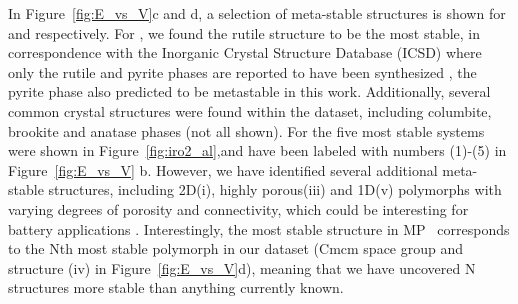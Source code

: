 In Figure~\ref{fig:E_vs_V}c and d, a selection of meta-stable structures is shown for \IrOtwo and \IrOthree respectively.
For \IrOtwo, we found the rutile structure to be the most stable, in correspondence with the Inorganic Crystal Structure Database (ICSD) where only the rutile and pyrite phases are reported to have been synthesized \cite{bolzan1997structural, shirako2014synthesis}, the pyrite phase also predicted to be metastable in this work. Additionally, several common \ABtwo crystal structures were found within the dataset, including columbite\cite{columbite}, brookite\cite{brookite} and anatase\cite{anatase} phases (not all shown).
%
For \IrOthree the five most stable systems were shown in Figure~\ref{fig:iro2_al},and have been labeled with numbers (1)-(5) in Figure~\ref{fig:E_vs_V} b. However, we have identified several additional meta-stable structures, including 2D(i), highly porous(iii) and 1D(v) polymorphs with varying degrees of porosity and connectivity,
which could be interesting for battery applications \cite{}.
%
Interestingly, the most stable \IrOthree structure in MP~\cite{mp-1097041} corresponds to the Nth most stable \IrOthree polymorph in our dataset (Cmcm space group and structure (iv) in Figure~\ref{fig:E_vs_V}d), meaning that we have uncovered N \IrOthree structures more stable than anything currently known.


